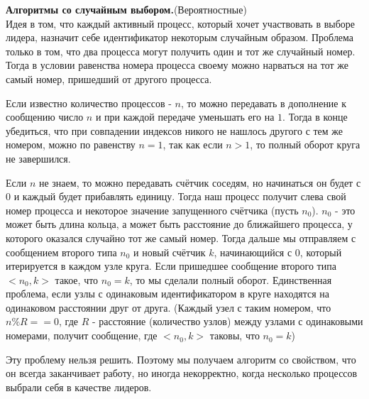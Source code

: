 \textbf{Алгоритмы со случайным выбором.}(Вероятностные)\\
Идея в том, что каждый активный процесс, который хочет участвовать в выборе лидера, назначит себе идентификатор некоторым случайным образом.
Проблема только в том, что два процесса могут получить один и тот же случайный номер. Тогда в условии равенства номера процесса своему можно нарваться на тот же самый номер, пришедший от другого процесса.

Если известно количество  процессов - $n$, то можно передавать в дополнение к сообщению число $n$ и при каждой передаче уменьшать его на $1$. Тогда в конце убедиться, что при совпадении индексов никого не нашлось другого с тем же номером, можно по равенству $n = 1$, так как если $n > 1$, то полный оборот круга не завершился.

Если $n$ не знаем, то можно передавать счётчик соседям, но начинаться он будет с $0$ и каждый будет прибавлять единицу. Тогда наш процесс получит слева свой номер процесса и некоторое значение запущенного счётчика (пусть $n_0$). $n_0$ - это может быть длина кольца, а может быть расстояние до ближайшего процесса, у которого оказался случайно тот же самый номер. Тогда дальше мы отправляем с сообщением второго типа $n_0$ и новый счётчик $k$, начинающийся с $0$, который итерируется в каждом узле круга. Если пришедшее сообщение второго типа $<n_0, k>$ такое, что $n_0 = k$, то мы сделали полный оборот. Единственная проблема, если узлы с одинаковым идентификатором в круге находятся на одинаковом расстоянии друг от друга. (Каждый узел с таким номером, что $n \% R == 0$, где $R$ - расстояние (количество узлов) между узлами с одинаковыми номерами, получит  сообщение, где $<n_0, k>$ таковы, что $n_0 = k$)

Эту проблему нельзя решить. Поэтому мы получаем алгоритм со свойством, что он всегда заканчивает работу, но иногда некорректно, когда несколько процессов выбрали себя в качестве лидеров.
